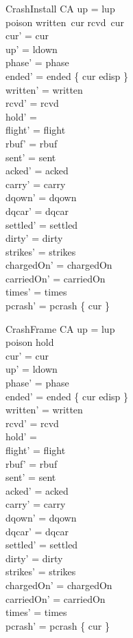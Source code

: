 \documentclass[a4paper,10pt,fleqn]{article}
\begin{document}
\begin{schema}{CrashInstall}
  \Delta CA
\where
  up = lup \\
  poison \in written~cur \setminus rcvd~cur \\
  cur' = cur \\
  up' = ldown \\
  phase' = phase \\
  ended' = ended \oplus \{ cur \mapsto edisp \} \\
  written' = written \\
  rcvd' = rcvd \\
  hold' = \emptyset \\
  flight' = flight \\
  rbuf' = rbuf \\
  sent' = sent \\
  acked' = acked \\
  carry' = carry \\
  dqown' = dqown \\
  dqcar' = dqcar \\
  settled' = settled \\
  dirty' = dirty \\
  strikes' = strikes \\
  chargedOn' = chargedOn \\
  carriedOn' = carriedOn \\
  times' = times \\
  pcrash' = pcrash \cup \{ cur \}
\end{schema}

\begin{schema}{CrashFrame}
  \Delta CA
\where
  up = lup \\
  poison \in \dom hold \\
  cur' = cur \\
  up' = ldown \\
  phase' = phase \\
  ended' = ended \oplus \{ cur \mapsto edisp \} \\
  written' = written \\
  rcvd' = rcvd \\
  hold' = \emptyset \\
  flight' = flight \\
  rbuf' = rbuf \\
  sent' = sent \\
  acked' = acked \\
  carry' = carry \\
  dqown' = dqown \\
  dqcar' = dqcar \\
  settled' = settled \\
  dirty' = dirty \\
  strikes' = strikes \\
  chargedOn' = chargedOn \\
  carriedOn' = carriedOn \\
  times' = times \\
  pcrash' = pcrash \cup \{ cur \}
\end{schema}
\end{document}
